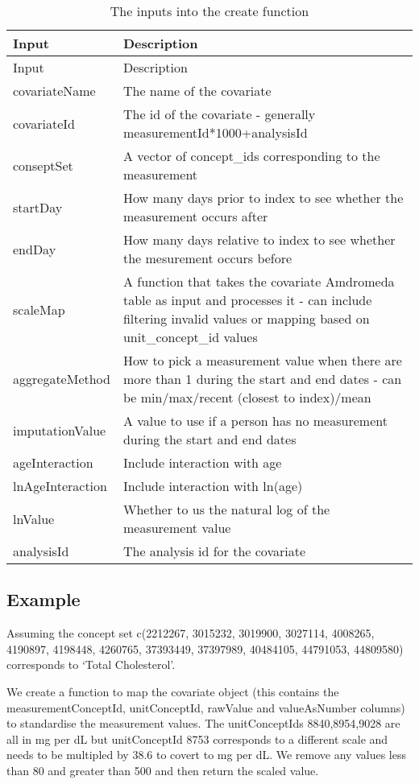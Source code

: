 \documentclass[
]{article}
\begin{document}
\begin{longtable}[]{@{}ll@{}}
\caption{The inputs into the create function}\tabularnewline
\toprule
Input & Description\tabularnewline
\midrule
\endfirsthead
\toprule
Input & Description\tabularnewline
\midrule
\endhead
covariateName & The name of the covariate\tabularnewline
covariateId & The id of the covariate - generally
measurementId*1000+analysisId\tabularnewline
conseptSet & A vector of concept\_ids corresponding to the
measurement\tabularnewline
startDay & How many days prior to index to see whether the measurement
occurs after\tabularnewline
endDay & How many days relative to index to see whether the mesurement
occurs before\tabularnewline
scaleMap & A function that takes the covariate Amdromeda table as input
and processes it - can include filtering invalid values or mapping based
on unit\_concept\_id values\tabularnewline
aggregateMethod & How to pick a measurement value when there are more
than 1 during the start and end dates - can be min/max/recent (closest
to index)/mean\tabularnewline
imputationValue & A value to use if a person has no measurement during
the start and end dates\tabularnewline
ageInteraction & Include interaction with age\tabularnewline
lnAgeInteraction & Include interaction with ln(age)\tabularnewline
lnValue & Whether to us the natural log of the measurement
value\tabularnewline
analysisId & The analysis id for the covariate\tabularnewline
\bottomrule
\end{longtable}

\hypertarget{example}{%
\subsection{Example}\label{example}}

Assuming the concept set c(2212267, 3015232, 3019900, 3027114, 4008265,
4190897, 4198448, 4260765, 37393449, 37397989, 40484105, 44791053,
44809580) corresponds to `Total Cholesterol'.

We create a function to map the covariate object (this contains the
measurementConceptId, unitConceptId, rawValue and valueAsNumber columns)
to standardise the measurement values. The unitConceptIds 8840,8954,9028
are all in mg per dL but unitConceptId 8753 corresponds to a different
scale and needs to be multipled by 38.6 to covert to mg per dL. We
remove any values less than 80 and greater than 500 and then return the
scaled value.
\end{document}

